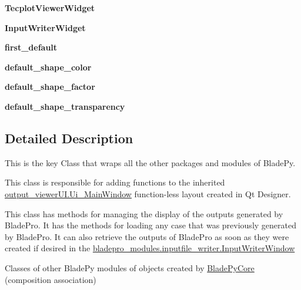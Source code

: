 \begin{DoxyCompactItemize}
{\bfseries Tecplot\+Viewer\+Widget}
\item 
\hypertarget{a00081_a4ead2c1cc874da56fad290cca0630fc0}{}\label{a00081_a4ead2c1cc874da56fad290cca0630fc0} 
{\bfseries Input\+Writer\+Widget}
\item 
\hypertarget{a00081_af0ce94ff8ed058ada4057b3062de1d0d}{}\label{a00081_af0ce94ff8ed058ada4057b3062de1d0d} 
{\bfseries first\+\_\+default}
\item 
\hypertarget{a00081_a74bd4997b68dd3f273e5eb6cbbbac70a}{}\label{a00081_a74bd4997b68dd3f273e5eb6cbbbac70a} 
{\bfseries default\+\_\+shape\+\_\+color}
\item 
\hypertarget{a00081_aafff31611ea2a5eb584f2550607e3e23}{}\label{a00081_aafff31611ea2a5eb584f2550607e3e23} 
{\bfseries default\+\_\+shape\+\_\+factor}
\item 
\hypertarget{a00081_a26accbeb5266ec3f792c86cf8643f696}{}\label{a00081_a26accbeb5266ec3f792c86cf8643f696} 
{\bfseries default\+\_\+shape\+\_\+transparency}
\end{DoxyCompactItemize}


\subsection{Detailed Description}
This is the key Class that wraps all the other packages and modules of Blade\+Py. 

This class is responsible for adding functions to the inherited \hyperlink{a00105}{output\+\_\+viewer\+U\+I.\+Ui\+\_\+\+Main\+Window} function-\/less layout created in Qt Designer.

This class has methods for managing the display of the outputs generated by Blade\+Pro. It has the methods for loading any case that was previously generated by Blade\+Pro. It can also retrieve the outputs of Blade\+Pro as soon as they were created if desired in the \hyperlink{a00073}{bladepro\+\_\+modules.\+inputfile\+\_\+writer.\+Input\+Writer\+Window}

Classes of other Blade\+Py modules of objects created by \hyperlink{a00081}{Blade\+Py\+Core} (composition association)

